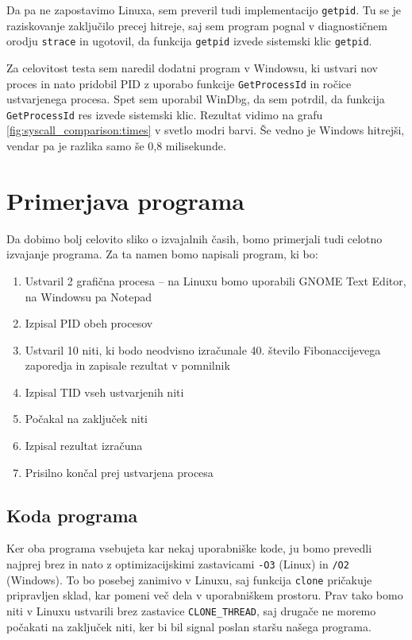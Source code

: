 \documentclass[a4paper,12pt,openright]{book}
\begin{document}
Da pa ne zapostavimo Linuxa, sem preveril tudi implementacijo \texttt{getpid}.
Tu se je raziskovanje zaključilo precej hitreje, saj sem program pognal v diagnostičnem orodju \texttt{strace} in ugotovil, da funkcija \texttt{getpid} izvede sistemski klic \texttt{getpid}.

Za celovitost testa sem naredil dodatni program v Windowsu, ki ustvari nov proces in nato pridobil PID z uporabo funkcije \texttt{GetProcessId} in ročice ustvarjenega procesa.
Spet sem uporabil WinDbg, da sem potrdil, da funkcija \texttt{GetProcessId} res izvede sistemski klic.
Rezultat vidimo na grafu \ref{fig:syscall_comparison:times} v svetlo modri barvi.
Še vedno je Windows hitrejši, vendar pa je razlika samo še 0,8 milisekunde.

\section{Primerjava programa}

Da dobimo bolj celovito sliko o izvajalnih časih, bomo primerjali tudi celotno izvajanje programa.
Za ta namen bomo napisali program, ki bo:
\begin{enumerate}
	\item Ustvaril 2 grafična procesa -- na Linuxu bomo uporabili GNOME Text Editor, na Windowsu pa Notepad
	\item Izpisal PID obeh procesov
	\item Ustvaril 10 niti, ki bodo neodvisno izračunale 40. število Fibonaccijevega zaporedja in zapisale rezultat v pomnilnik
	\item Izpisal TID vseh ustvarjenih niti
	\item Počakal na zaključek niti
	\item Izpisal rezultat izračuna
	\item Prisilno končal prej ustvarjena procesa
\end{enumerate}

\subsection{Koda programa}

Ker oba programa vsebujeta kar nekaj uporabniške kode, ju bomo prevedli najprej brez in nato z optimizacijskimi zastavicami \texttt{-O3} (Linux) in \texttt{/O2} (Windows).
To bo posebej zanimivo v Linuxu, saj funkcija \texttt{clone} pričakuje pripravljen sklad, kar pomeni več dela v uporabniškem prostoru.
Prav tako bomo niti v Linuxu ustvarili brez zastavice \texttt{CLONE\_THREAD}, saj drugače ne moremo počakati na zaključek niti, ker bi bil signal poslan staršu našega programa.
\end{document}
